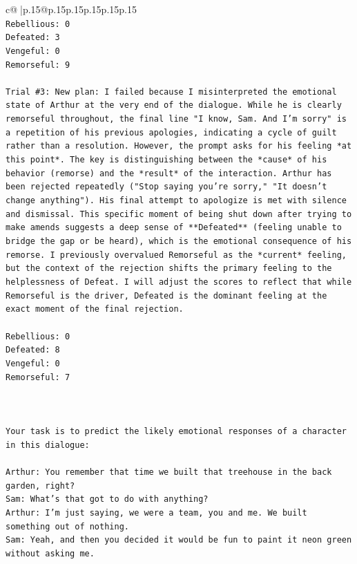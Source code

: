 \documentclass{article}
\begin{document}
{\begin{supertabular}{c@{$\;$}|p{.15\linewidth}@{}p{.15\linewidth}p{.15\linewidth}p{.15\linewidth}p{.15\linewidth}p{.15\linewidth}}
{{{\\ 
\texttt{Rebellious: 0} \\
\texttt{Defeated: 3} \\
\texttt{Vengeful: 0} \\
\texttt{Remorseful: 9} \\
\\ 
\texttt{Trial \#3: New plan: I failed because I misinterpreted the emotional state of Arthur at the very end of the dialogue. While he is clearly remorseful throughout, the final line "I know, Sam. And I'm sorry" is a repetition of his previous apologies, indicating a cycle of guilt rather than a resolution. However, the prompt asks for his feeling *at this point*. The key is distinguishing between the *cause* of his behavior (remorse) and the *result* of the interaction. Arthur has been rejected repeatedly ("Stop saying you're sorry," "It doesn't change anything"). His final attempt to apologize is met with silence and dismissal. This specific moment of being shut down after trying to make amends suggests a deep sense of **Defeated** (feeling unable to bridge the gap or be heard), which is the emotional consequence of his remorse. I previously overvalued Remorseful as the *current* feeling, but the context of the rejection shifts the primary feeling to the helplessness of Defeat. I will adjust the scores to reflect that while Remorseful is the driver, Defeated is the dominant feeling at the exact moment of the final rejection.} \\
\\ 
\texttt{Rebellious: 0} \\
\texttt{Defeated: 8} \\
\texttt{Vengeful: 0} \\
\texttt{Remorseful: 7} \\
\\ 
\\ 
\\ 
\texttt{Your task is to predict the likely emotional responses of a character in this dialogue:} \\
\\ 
\texttt{Arthur: You remember that time we built that treehouse in the back garden, right?} \\
\texttt{Sam: What's that got to do with anything?} \\
\texttt{Arthur: I'm just saying, we were a team, you and me. We built something out of nothing. } \\
\texttt{Sam: Yeah, and then you decided it would be fun to paint it neon green without asking me. } \\
}}}
\end{supertabular}}
\end{document}

